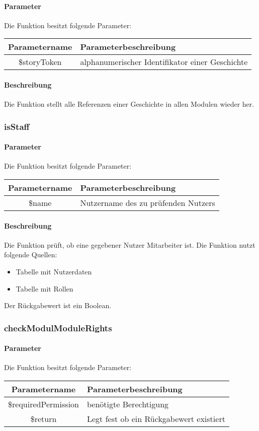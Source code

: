 \paragraph{Parameter} Die Funktion besitzt folgende Parameter:
\begin{table}[H]
	\begin{tabular}{|c|p{11cm}|}
		\hline
		\textbf{Parametername} & \textbf{Parameterbeschreibung} \\ \hline
		\$storyToken & alphanumerischer Identifikator einer Geschichte \\ \hline
	\end{tabular}
\end{table}
\paragraph{Beschreibung} Die Funktion stellt alle Referenzen einer Geschichte in allen Modulen wieder her.
\subsubsection{isStaff}
\paragraph{Parameter} Die Funktion besitzt folgende Parameter:
\begin{table}[H]
	\begin{tabular}{|c|p{11cm}|}
		\hline
		\textbf{Parametername} & \textbf{Parameterbeschreibung} \\ \hline
		\$name & Nutzername des zu prüfenden Nutzers \\ \hline
	\end{tabular}
\end{table}
\paragraph{Beschreibung} Die Funktion prüft, ob eine gegebener Nutzer Mitarbeiter ist. Die Funktion nutzt folgende Quellen:
\begin{itemize}
	\item Tabelle mit Nutzerdaten
	\item Tabelle mit Rollen
\end{itemize}
Der Rückgabewert ist ein Boolean.
\subsubsection{checkModulModuleRights}
\paragraph{Parameter} Die Funktion besitzt folgende Parameter:
\begin{table}[H]
	\begin{tabular}{|c|p{11cm}|}
		\hline
		\textbf{Parametername} & \textbf{Parameterbeschreibung} \\ \hline
		\$requiredPermission & benötigte Berechtigung \\ \hline
		\$return             & Legt fest ob ein Rückgabewert existiert \\ \hline
	\end{tabular}
\end{table}
